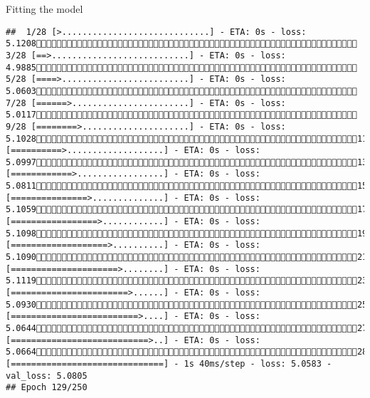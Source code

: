 \documentclass[
  ignorenonframetext,
]{beamer}
\begin{document}
\begin{frame}[fragile]{Fitting the model}
\begin{verbatim}
##  1/28 [>.............................] - ETA: 0s - loss: 5.1208 3/28 [==>...........................] - ETA: 0s - loss: 4.9885 5/28 [====>.........................] - ETA: 0s - loss: 5.0603 7/28 [======>.......................] - ETA: 0s - loss: 5.0117 9/28 [========>.....................] - ETA: 0s - loss: 5.102811/28 [==========>...................] - ETA: 0s - loss: 5.099713/28 [============>.................] - ETA: 0s - loss: 5.081115/28 [===============>..............] - ETA: 0s - loss: 5.105917/28 [=================>............] - ETA: 0s - loss: 5.109819/28 [===================>..........] - ETA: 0s - loss: 5.109021/28 [=====================>........] - ETA: 0s - loss: 5.111923/28 [=======================>......] - ETA: 0s - loss: 5.093025/28 [=========================>....] - ETA: 0s - loss: 5.064427/28 [===========================>..] - ETA: 0s - loss: 5.066428/28 [==============================] - 1s 40ms/step - loss: 5.0583 - val_loss: 5.0805
## Epoch 129/250

\end{verbatim}
\end{frame}
\end{document}
